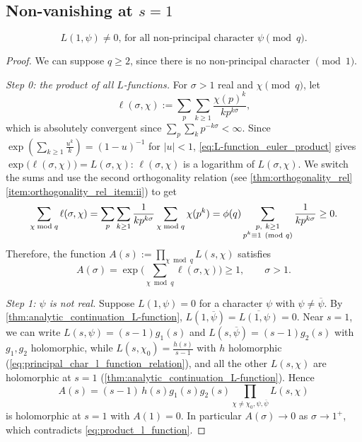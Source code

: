 \subsection{Non-vanishing at $s=1$}
\begin{theorem}\label{thm:L-function_neq_0_non-trivial}
    \begin{equation*}
        L(1,\psi)\neq 0 \text{, for all non-principal character } \psi \pmod q .
    \end{equation*}
\end{theorem}
\begin{proof}
    We can suppose $q \ge 2$, since there is no non-principal character $\pmod 1$.

    \emph{Step 0: the product of all $L$-functions.} For $\sigma>1$ real and $\chi\pmod q$, let
    \begin{equation*}
        \ell(\sigma,\chi) := \sum_{p}\sum_{k\ge1}\frac{\chi(p)^k}{kp^{k\sigma}},
    \end{equation*}
    which is absolutely convergent since $\sum_p\sum_k p^{-k\sigma} <\infty$. Since $\exp\left(\sum_{k\ge1}\frac{u^k}{k}\right) = (1-u)^{-1}$ for $\lvert u\rvert<1$, \cref{eq:L-function_euler_product} gives $\exp\big(\ell(\sigma,\chi)\big) = L(\sigma,\chi)$: $\ell(\sigma,\chi)$ is a logarithm of $L(\sigma,\chi)$. We switch the sums and use the second orthogonality relation (see \cref{thm:orthogonality_rel} \ref{item:orthogonality_rel_item:ii}) to get
    \begin{equation*}
        \sum_{\chi \bmod q}\ell(\sigma,\chi) = \sum_{p}\sum_{k\ge 1}\frac{1}{kp^{k\sigma}} \sum_{\chi \bmod q}\chi(p^k) = \phi(q) \sum_{\substack{p,\ k\ge 1\\ p^k \equiv 1 \tpmod q}} \frac{1}{kp^{k\sigma}}\ge 0.
    \end{equation*}
    Therefore, the function $A(s) := \prod_{\chi \bmod q} L(s,\chi)$ satisfies
    \begin{equation}\label{eq:product_l_function}
        A(\sigma) = \exp\Big(\sum_{\chi \bmod q}\ell(\sigma,\chi)\Big)\ge 1, \qquad \sigma >1.
    \end{equation}

    \emph{Step 1: $\psi$ is not real.} Suppose $L(1,\psi) = 0$ for a character $\psi$ with $\psi\neq\overline\psi$. By \cref{thm:analytic_continuation_L-function}, $L(1,\overline\psi) = \overline{L(1,\psi)} = 0$. Near $s=1$, we can write $L(s,\psi) = (s-1)g_1(s)$ and $L(s,\overline\psi) = (s-1)g_2(s)$ with $g_1,g_2$ holomorphic, while $L(s,\chi_0) = \frac{h(s)}{s-1}$ with $h$ holomorphic (\cref{eq:principal_char_l_function_relation}), and all the other $L(s,\chi)$ are holomorphic at $s = 1$ (\cref{thm:analytic_continuation_L-function}). Hence
    \begin{equation*}
        A(s) = (s-1)\,h(s)g_1(s)g_2(s)\prod_{\chi\neq\chi_0,\psi,\overline\psi}L(s,\chi)
    \end{equation*}
    is holomorphic at $s = 1$ with $A(1) = 0$. In particular $A(\sigma) \to 0$ as $\sigma\to1^+$, which contradicts \cref{eq:product_l_function}.


\end{proof}
